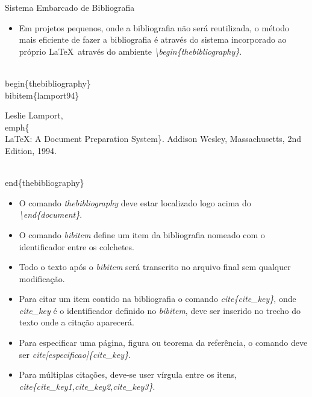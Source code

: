 \documentclass{beamer}
\begin{document}
\begin{frame}{Sistema Embarcado de Bibliografia}

  \begin{itemize}
    \item Em projetos pequenos, onde a bibliografia não será reutilizada, o método mais eficiente de fazer a bibliografia
    é através do sistema incorporado ao próprio \LaTeX\ através do ambiente \textit{\textbackslash begin\{thebibliography\}}.    
  \end{itemize}

  \begin{block}{}
  \begin{semiverbatim}
    \\begin\{thebibliography\}
    \\bibitem\{lamport94\}

      Leslie Lamport,
      \\emph\{\\LaTeX: A Document Preparation System\}.
      Addison Wesley, Massachusetts,
      2nd Edition,
      1994.

    \\end\{thebibliography\}
  \end{semiverbatim}
  \end{block}

  \begin{itemize}
    \item O comando \textit{thebibliography} deve estar localizado logo acima do \textit{\textbackslash end\{document\}}.
    \item O comando \textit{bibitem} define um item da bibliografia nomeado com o identificador entre os colchetes.
    \item Todo o texto após o \textit{bibitem} será transcrito no arquivo final sem qualquer modificação.
  \end{itemize}

  \begin{itemize}
   \item Para citar um item contido na bibliografia o comando \textit{cite\{cite\_key\}}, onde \textit{cite\_key} é o 
   identificador definido no \textit{bibitem}, deve ser inserido no trecho do texto onde a citação aparecerá.
   \item Para especificar uma página, figura ou teorema da referência, o comando deve ser \textit{cite[especificao]\{cite\_key\}}.
   \item Para múltiplas citações, deve-se user vírgula entre os itens, \textit{cite\{cite\_key1,cite\_key2,cite\_key3\}}.    
  \end{itemize}
 
\end{frame}
\end{document}

